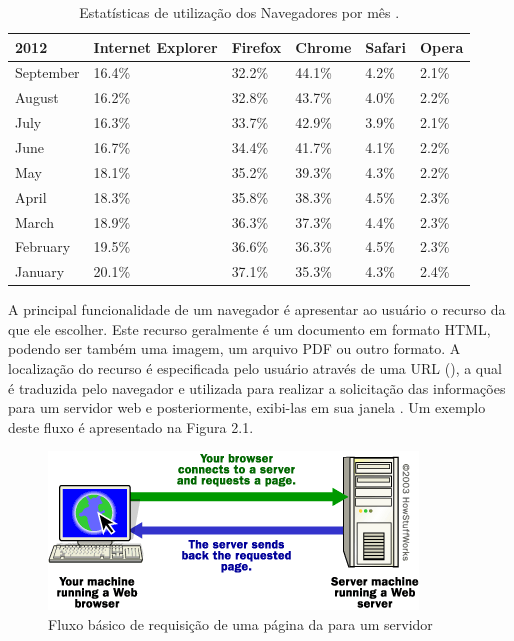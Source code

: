 \documentclass[espaco=simples,appendix=Name]{abnt}
\begin{document}
\begin{description}
\begin{table}[ht]
	\centering
	\caption{Estatísticas de utilização dos Navegadores por mês \cite{W3schools}.
	\label{tbl:padc}}{
		\vspace{0.3cm}
		\begin{tabular}{|l|l|l|l|l|l|}
	    	\hline
			\textbf{2012} & \textbf{Internet Explorer} & \textbf{Firefox} &\textbf{Chrome} & \textbf{Safari} & \textbf{Opera} \\
			\hline
			September	& 16.4\% & 32.2\% & 44.1\% & 4.2\% & 2.1\% \\
			\hline
			August		& 16.2\% & 32.8\% & 43.7\% & 4.0\% & 2.2\% \\
			\hline
			July		& 16.3\% & 33.7\% & 42.9\% & 3.9\% & 2.1\% \\
			\hline
			June		& 16.7\% & 34.4\% & 41.7\% & 4.1\% & 2.2\% \\
			\hline
			May			& 18.1\% & 35.2\% & 39.3\% & 4.3\% & 2.2\% \\
			\hline
			April		& 18.3\% & 35.8\% &	38.3\% & 4.5\% & 2.3\% \\
			\hline
			March		& 18.9\% & 36.3\% &	37.3\% & 4.4\% & 2.3\% \\
			\hline
			February	& 19.5\% & 36.6\% &	36.3\% & 4.5\% & 2.3\% \\
			\hline
			January		& 20.1\% & 37.1\% &	35.3\% & 4.3\% & 2.4\% \\
			\hline
		\end{tabular}
		}
\end{table}
A principal funcionalidade de um navegador é apresentar ao usuário o recurso da  que ele escolher. Este  recurso geralmente é um documento em formato HTML, podendo ser também uma imagem, um arquivo PDF ou outro formato. A localização do recurso é especificada pelo usuário através de uma URL (), a qual é traduzida pelo navegador e utilizada para realizar a solicitação das informações para um servidor web e posteriormente, exibi-las em sua janela \cite{ArchitectureWebBrowsers}. Um exemplo deste fluxo é apresentado na Figura 2.1.

\begin{figure}[h]
  \centering
    \includegraphics[scale=1]{web_basic.png}
  \caption{Fluxo básico de requisição de uma página da  para um servidor \protect\cite{BrowserStats}}
\end{figure}
 

\end{description}
\end{document}
